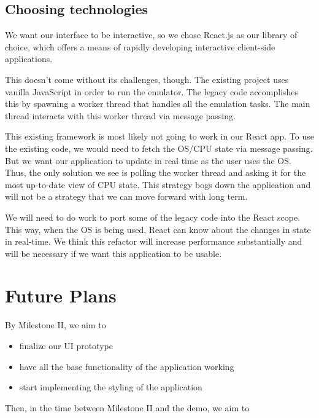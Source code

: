 \subsection*{Choosing technologies}

We want our interface to be interactive, so we chose React.js as our library of choice,
which offers a means of rapidly developing interactive client-side applications.

This doesn't come without its challenges, though. The existing project uses vanilla JavaScript
in order to run the emulator. The legacy code accomplishes this by spawning a worker thread
that handles all the emulation tasks. The main thread interacts with this worker thread via
message passing.

This existing framework is most likely not going to work in our React app. 
To use the existing code, we would
need to fetch the OS/CPU state via message passing. But we want our application to update in real
time as the user uses the OS. Thus, the only solution we see is polling the worker thread and
asking it for the most up-to-date view of CPU state. This strategy bogs down the application
and will not be a strategy that we can move forward with long term.

We will need to do work to port some of the legacy code into the React scope. This way, when 
the OS is being used, React can know about the changes in state in real-time. 
We think this refactor will increase performance substantially and will be necessary
if we want this application to be usable.


\section*{Future Plans}

By Milestone II, we aim to

\begin{itemize}
  \item finalize our UI prototype
  \item have all the base functionality of the application working
  \item start implementing the styling of the application
\end{itemize}

Then, in the time between Milestone II and the demo, we aim to

